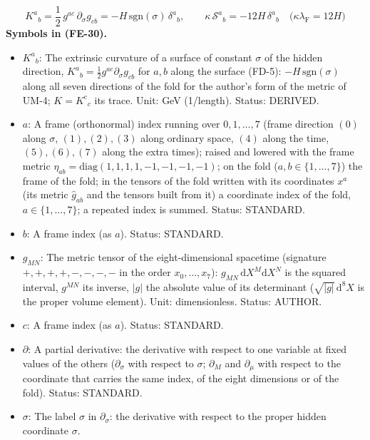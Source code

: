 \documentclass[
  10pt,
]{article}
\providecommand{\tightlist}{%
  \setlength{\itemsep}{0pt}\setlength{\parskip}{0pt}}
\begin{document}
\[
K^a{}_b = \frac12\,g^{ac}\,\partial_\sigma g_{cb} = -H\,\mathrm{sgn}(\sigma)\,\delta^a{}_b,\qquad
\kappa\,\mathcal{S}^a{}_b = -12H\,\delta^a{}_b\quad\big(\kappa\lambda_{\mathrm{F}} = 12H\big) \tag{FE-30}
\] \textbf{Symbols in (FE-30).}

\begin{itemize}
\tightlist
\item
  \(K^a{}_b\): The extrinsic curvature of a surface of constant
  \(\sigma\) of the hidden direction,
  \(K^a{}_b = \frac12 g^{ac}\partial_\sigma g_{cb}\) for \(a, b\) along
  the surface (FD-5): \(-H\,\mathrm{sgn}(\sigma)\) along all seven
  directions of the fold for the author's form of the metric of UM-4;
  \(K = K^c{}_c\) its trace. Unit: GeV (1/length). Status: DERIVED.
\item
  \(a\): A frame (orthonormal) index running over \(0, 1, \dots, 7\)
  (frame direction \((0)\) along \(\sigma\), \((1), (2), (3)\) along
  ordinary space, \((4)\) along the time, \((5), (6), (7)\) along the
  extra times); raised and lowered with the frame metric
  \(\eta_{ab} = \mathrm{diag}(1, 1, 1, 1, -1, -1, -1, -1)\); on the fold
  (\(a, b \in \{1, \dots, 7\}\)) the frame of the fold; in the tensors
  of the fold written with its coordinates \(x^a\) (its metric
  \(\hat g_{ab}\) and the tensors built from it) a coordinate index of
  the fold, \(a \in \{1, \dots, 7\}\); a repeated index is summed.
  Status: STANDARD.
\item
  \(b\): A frame index (as \(a\)). Status: STANDARD.
\item
  \(g_{MN}\): The metric tensor of the eight-dimensional spacetime
  (signature \(+,+,+,+,-,-,-,-\) in the order \(x_0, \dots, x_7\)):
  \(g_{MN}\,\mathrm{d}X^M\mathrm{d}X^N\) is the squared interval,
  \(g^{MN}\) its inverse, \(\lvert g\rvert\) the absolute value of its
  determinant (\(\sqrt{\lvert g\rvert}\,\mathrm{d}^8X\) is the proper
  volume element). Unit: dimensionless. Status: AUTHOR.
\item
  \(c\): A frame index (as \(a\)). Status: STANDARD.
\item
  \(\partial\): A partial derivative: the derivative with respect to one
  variable at fixed values of the others (\(\partial_\sigma\) with
  respect to \(\sigma\); \(\partial_M\) and \(\partial_\mu\) with
  respect to the coordinate that carries the same index, of the eight
  dimensions or of the fold). Status: STANDARD.
\item
  \(\sigma\): The label \(\sigma\) in \(\partial_\sigma\): the
  derivative with respect to the proper hidden coordinate \(\sigma\).

\end{itemize}
\end{document}
